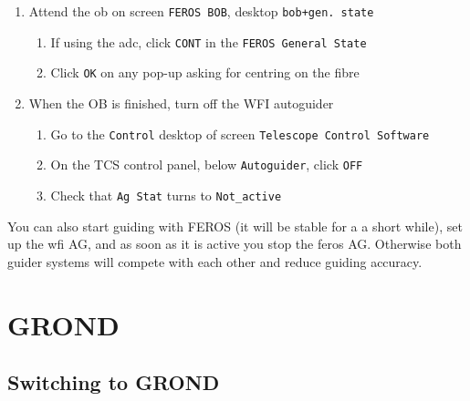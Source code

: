 \documentclass[11pt,fleqn,a4paper]{book}
\begin{document}
\begin{enumerate}
\begin{enumerate}
         \item Select \texttt{Offset} and tick checkbox \texttt{Combined Offsets}.
         \item Enter offset values for both axes (0.3) and click \texttt{Store}.
         \item While monitoring the \gls{ferosag} on screen \texttt{Autoguider GROND \& FEROS}, use arrows to centre the target\\
              A full fibre width is 5 arrow clicks.\\
              Keep in mind the centring will have a delay of 10--15\,s. 
    \end{enumerate}
    \item Attend the \gls{ob} on  screen \texttt{FEROS BOB}, \gls{desktop} \texttt{bob+gen. state}
    \begin{enumerate}
        \item If using the \gls{adc}, click \texttt{CONT} in the \texttt{FEROS \gls{General State}}
        \item Click \texttt{OK} on any pop-up asking for centring on the fibre
    \end{enumerate}
    \item When the OB is finished, turn off the WFI autoguider
        \begin{enumerate}
            \item Go to the \texttt{Control} \gls{desktop} of screen \texttt{Telescope Control Software}
            \item On the \gls{TCS control panel}, below \texttt{Autoguider}, click \texttt{OFF} 
            \item Check that \texttt{Ag Stat} turns to \texttt{Not\_active}
        \end{enumerate}
\end{enumerate}

You can also start guiding with FEROS (it will be stable for a a short while), set up the \gls{wfi} AG, and as soon as it is active you stop the \gls{feros} AG. Otherwise both guider systems will compete with each other and reduce guiding accuracy.

\section{GROND}

\subsection{Switching to GROND}
\end{document}
